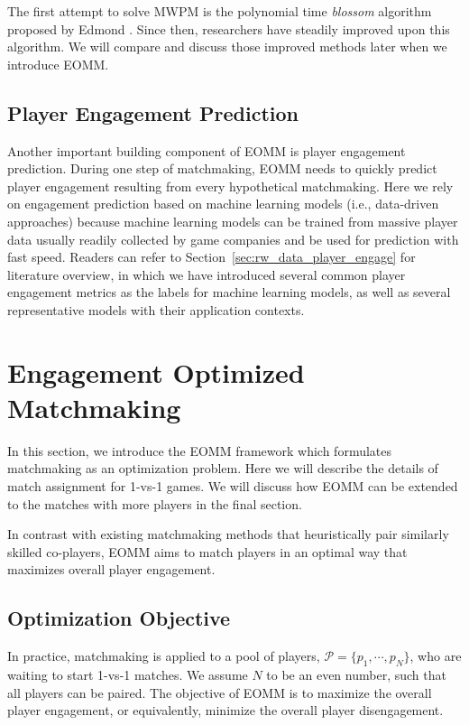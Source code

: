 The first attempt to solve MWPM is the polynomial time \textit{blossom} algorithm proposed by Edmond \cite{edmonds1965maximum,edmonds1965paths}. Since then, researchers have steadily improved upon this algorithm. We will compare and discuss those improved methods later when we introduce EOMM.

\subsection{Player Engagement Prediction}
Another important building component of EOMM is player engagement prediction. During one step of matchmaking, EOMM needs to quickly predict player engagement resulting from every hypothetical matchmaking. Here we rely on engagement prediction based on machine learning models (i.e., data-driven approaches) because machine learning models can be trained from massive player data usually readily collected by game companies and be used for prediction with fast speed. Readers can refer to Section~\ref{sec:rw_data_player_engage} for literature overview, in which we have introduced several common player engagement metrics as the labels for machine learning models, as well as several representative models with their application contexts.

\section{Engagement Optimized Matchmaking}\label{sec:optimization}
In this section, we introduce the EOMM framework which formulates matchmaking as an optimization problem. Here we will describe the details of match assignment for 1-vs-1 games. We will discuss how EOMM can be extended to the matches with more players in the final section.

In contrast with existing matchmaking methods that heuristically pair similarly skilled co-players, EOMM aims to match players in an optimal way that maximizes overall player engagement. 

\subsection{Optimization Objective}
In practice, matchmaking is applied to a pool of players, $\mathcal{P}=\{p_1, \cdots, p_N\}$, who are waiting to start 1-vs-1 matches. We assume $N$ to be an even number, such that all players can be paired. The objective of EOMM is to maximize the overall player engagement, or equivalently, minimize the overall player disengagement. 

